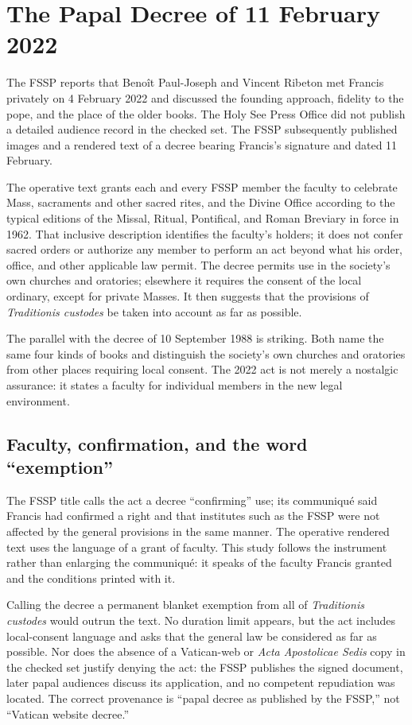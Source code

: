 \section{The Papal Decree of 11 February 2022}

The FSSP reports that Benoît Paul-Joseph and Vincent Ribeton met Francis privately on 4 February 2022 and discussed the founding approach, fidelity to the pope, and the place of the older books. The Holy See Press Office did not publish a detailed audience record in the checked set. The FSSP subsequently published images and a rendered text of a decree bearing Francis's signature and dated 11 February.

The operative text grants each and every FSSP member the faculty to celebrate Mass, sacraments and other sacred rites, and the Divine Office according to the typical editions of the Missal, Ritual, Pontifical, and Roman Breviary in force in 1962. That inclusive description identifies the faculty's holders; it does not confer sacred orders or authorize any member to perform an act beyond what his order, office, and other applicable law permit. The decree permits use in the society's own churches and oratories; elsewhere it requires the consent of the local ordinary, except for private Masses. It then suggests that the provisions of \emph{Traditionis custodes} be taken into account as far as possible.

The parallel with the decree of 10 September 1988 is striking. Both name the same four kinds of books and distinguish the society's own churches and oratories from other places requiring local consent. The 2022 act is not merely a nostalgic assurance: it states a faculty for individual members in the new legal environment.

\subsection{Faculty, confirmation, and the word ``exemption''}

The FSSP title calls the act a decree ``confirming'' use; its communiqué said Francis had confirmed a right and that institutes such as the FSSP were not affected by the general provisions in the same manner. The operative rendered text uses the language of a grant of faculty. This study follows the instrument rather than enlarging the communiqué: it speaks of the faculty Francis granted and the conditions printed with it.

Calling the decree a permanent blanket exemption from all of \emph{Traditionis custodes} would outrun the text. No duration limit appears, but the act includes local-consent language and asks that the general law be considered as far as possible. Nor does the absence of a Vatican-web or \emph{Acta Apostolicae Sedis} copy in the checked set justify denying the act: the FSSP publishes the signed document, later papal audiences discuss its application, and no competent repudiation was located. The correct provenance is ``papal decree as published by the FSSP,'' not ``Vatican website decree.''

